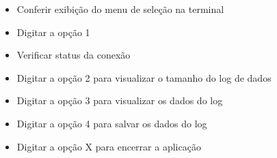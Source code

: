 \documentclass[10pt,twocolumn,letterpaper]{article}
\begin{document}
\begin{itemize}
  \item Conferir exibição do menu de seleção na terminal
  \item Digitar a opção 1
  \item Verificar status da conexão
  \item Digitar a opção 2 para visualizar o tamanho do log de dados
  \item Digitar a opção 3 para visualizar os dados do log
  \item Digitar a opção 4 para salvar os dados do log
  \item Digitar a opção X para encerrar a aplicação
\end{itemize}
\end{document}
